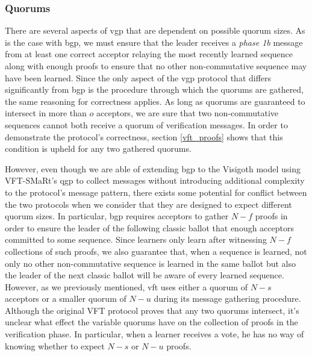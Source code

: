 \subsubsection{Quorums}
There are several aspects of \acrshort{vgp} that are dependent on possible quorum sizes. As is the case with \acrshort{bgp}, we must ensure that the leader receives a \textit{phase 1b} message from at least one correct acceptor relaying the most recently learned sequence along with enough proofs to ensure that no other non-commutative sequence may have been learned. Since the only aspect of the \acrshort{vgp} protocol that differs significantly from \acrshort{bgp} is the procedure through which the quorums are gathered, the same reasoning for correctness applies. As long as quorums are guaranteed to intersect in more than $o$ acceptors, we are sure that two non-commutative sequences cannot both receive a quorum of verification messages. In order to demonstrate the protocol's correctness, section \ref{vft_proofs} shows that this condition is upheld for any two gathered quorums. \par
However, even though we are able of extending \acrshort{bgp} to the Visigoth model using VFT-SMaRt's \acrshort{qgp} to collect messages without introducing additional complexity to the protocol's message pattern, there exists some potential for conflict between the two protocols when we consider that they are designed to expect different quorum sizes. In particular, \acrshort{bgp} requires acceptors to gather $N-f$ proofs in order to ensure the leader of the following classic ballot that enough acceptors committed to some sequence. Since learners only learn after witnessing $N-f$ collections of such proofs, we also guarantee that, when a sequence is learned, not only no other non-commutative sequence is learned in the same ballot but also the leader of the next classic ballot will be aware of every learned sequence. However, as we previously mentioned, \acrshort{vft} uses either a quorum of $N-s$ acceptors or a smaller quorum of $N-u$ during its message gathering procedure. Although the original VFT protocol proves that any two quorums intersect, it's unclear what effect the variable quorums have on the collection of proofs in the verification phase. In particular, when a learner receives a vote, he has no way of knowing whether to expect $N-s$ or $N-u$ proofs. \par 
